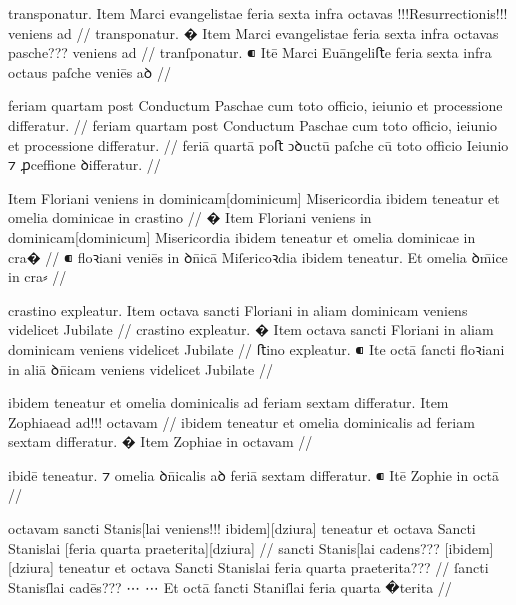 \ex \bg
\gla
{}
transponatur.
{} Item Marci evangelistae feria sexta infra octavas !!!Resurrectionis!!! {}
veniens ad
//
\glRekonstrukcja
{}
transponatur.
� Item Marci evangelistae feria sexta infra octavas {} pasche???
veniens ad
//
\glU
{}
tranſponatur. ⁌ Itē Marci Euāngeliﬅe feria sexta infra octaus {} paſche veniēs aꝺ
//
\endgl
\xe



\ex \bg
\gla
{}
feriam quartam post Conductum Paschae cum toto officio,
ieiunio et processione differatur.
//
\glRekonstrukcja
{}
feriam quartam post Conductum Paschae cum toto officio,
ieiunio et processione differatur.
//
\glU
{}
feriā quartā poﬅ ↄꝺuctū paſche cū toto oﬀicio Ieiunio ⁊ ꝓceﬀione ꝺiﬀeratur.
//
\endgl
\xe



\ex \bg
\gla
{}
{} Item Floriani veniens in dominicam[dominicum] Misericordia ibidem teneatur
et omelia dominicae in crastino
//
\glRekonstrukcja
{}
� Item Floriani veniens in dominicam[dominicum] Misericordia ibidem teneatur
et omelia dominicae in cra�
//
\glU
{}
⁌ {} floꝛiani veniēs in ꝺn̄icā Miſericoꝛdia ibidem teneatur. Et omelia ꝺm̄ice in cra⸗
//
\endgl
\xe




\ex \bg
\gla
{}
crastino expleatur.
{} Item octava sancti Floriani in aliam dominicam veniens videlicet
Jubilate
//
\glRekonstrukcja
{}
crastino expleatur.
� Item octava sancti Floriani in aliam dominicam veniens videlicet
Jubilate
//
\glU
{}
ﬅino expleatur. ⁌ Ite octā ſancti floꝛiani in aliā ꝺn̄icam veniens videlicet Jubilate
//
\endgl
\xe


\ex \bg
\gla
{}
ibidem teneatur et omelia dominicalis ad feriam sextam differatur.
{} Item Zophiaead ad!!! {} octavam 
//
\glRekonstrukcja
{}
ibidem teneatur et omelia dominicalis ad feriam sextam differatur.
� Item Zophiae {} in octavam 
//

ibidē teneatur. ⁊ omelia ꝺn̄icalis aꝺ feriā sextam diﬀeratur. ⁌ Itē Zophie {} in octā
//
\endgl
\xe



\ex \bg
\gla
{}
octavam sancti Stanis[lai veniens!!! {} ibidem][dziura] teneatur et octava Sancti Stanislai [feria quarta praeterita][dziura]
//
\glRekonstrukcja
{}
{} sancti Stanis[lai {} cadens??? [ibidem][dziura] teneatur et octava Sancti Stanislai feria quarta praeterita???
//
\glU
{}
{} ſancti Stanisſlai {} cadēs??? ⋯ ⋯ Et octā ſancti Staniſlai feria quarta �terita
//
\endgl
\xe



